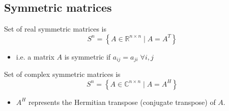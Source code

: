 \subsection{Symmetric matrices}
\begin{definition}
    Set of real symmetric matrices is 
    \[
    S^n = \left\{ A \in \mathbb{R}^{n \times n} \mid A = A^T \right\}
    \]
    \begin{itemize}
        \item i.e. a matrix $A$ is symmetric if $a_{ij} = a_{ji} \; \forall i,j$
    \end{itemize}
    \vspace{1em}

    Set of complex symmetric matrices is
    \[
    S^n = \left\{ A \in \mathbb{C}^{n \times n} \mid A = A^H \right\}
    \]
    \begin{itemize}
        \item $A^H$ represents the Hermitian transpose (conjugate transpose) of $A$.
    \end{itemize}
    
\end{definition}

